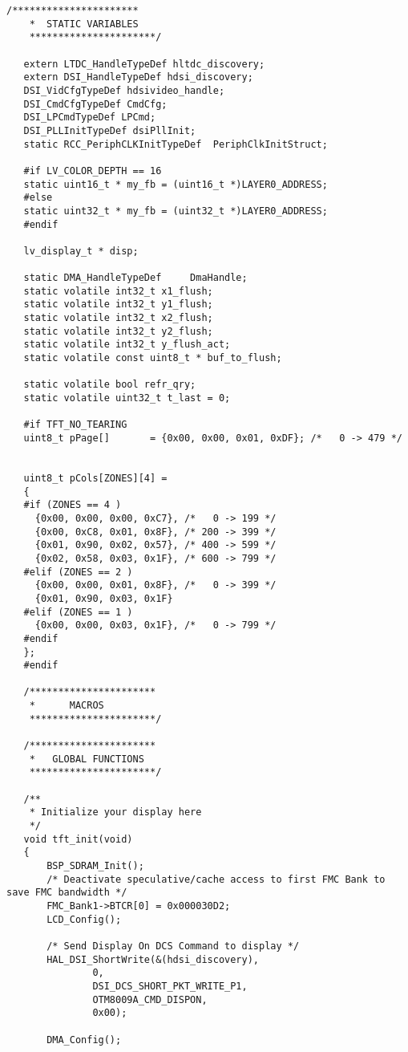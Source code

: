 \begin{lstlisting}[captionpos=t, caption={Fichero \texttt{tft.c}}]
   /**********************
    *  STATIC VARIABLES
    **********************/
   
   extern LTDC_HandleTypeDef hltdc_discovery;
   extern DSI_HandleTypeDef hdsi_discovery;
   DSI_VidCfgTypeDef hdsivideo_handle;
   DSI_CmdCfgTypeDef CmdCfg;
   DSI_LPCmdTypeDef LPCmd;
   DSI_PLLInitTypeDef dsiPllInit;
   static RCC_PeriphCLKInitTypeDef  PeriphClkInitStruct;
   
   #if LV_COLOR_DEPTH == 16
   static uint16_t * my_fb = (uint16_t *)LAYER0_ADDRESS;
   #else
   static uint32_t * my_fb = (uint32_t *)LAYER0_ADDRESS;
   #endif
   
   lv_display_t * disp;
   
   static DMA_HandleTypeDef     DmaHandle;
   static volatile int32_t x1_flush;
   static volatile int32_t y1_flush;
   static volatile int32_t x2_flush;
   static volatile int32_t y2_flush;
   static volatile int32_t y_flush_act;
   static volatile const uint8_t * buf_to_flush;
   
   static volatile bool refr_qry;
   static volatile uint32_t t_last = 0;
   
   #if TFT_NO_TEARING
   uint8_t pPage[]       = {0x00, 0x00, 0x01, 0xDF}; /*   0 -> 479 */
   
   
   uint8_t pCols[ZONES][4] =
   {
   #if (ZONES == 4 )
     {0x00, 0x00, 0x00, 0xC7}, /*   0 -> 199 */
     {0x00, 0xC8, 0x01, 0x8F}, /* 200 -> 399 */
     {0x01, 0x90, 0x02, 0x57}, /* 400 -> 599 */
     {0x02, 0x58, 0x03, 0x1F}, /* 600 -> 799 */
   #elif (ZONES == 2 )
     {0x00, 0x00, 0x01, 0x8F}, /*   0 -> 399 */
     {0x01, 0x90, 0x03, 0x1F}
   #elif (ZONES == 1 )
     {0x00, 0x00, 0x03, 0x1F}, /*   0 -> 799 */
   #endif
   };
   #endif
   
   /**********************
    *      MACROS
    **********************/
   
   /**********************
    *   GLOBAL FUNCTIONS
    **********************/
   
   /**
    * Initialize your display here
    */
   void tft_init(void)
   {
       BSP_SDRAM_Init();
       /* Deactivate speculative/cache access to first FMC Bank to save FMC bandwidth */
       FMC_Bank1->BTCR[0] = 0x000030D2;
       LCD_Config();
   
       /* Send Display On DCS Command to display */
       HAL_DSI_ShortWrite(&(hdsi_discovery),
               0,
               DSI_DCS_SHORT_PKT_WRITE_P1,
               OTM8009A_CMD_DISPON,
               0x00);
   
       DMA_Config();
   

\end{lstlisting}
